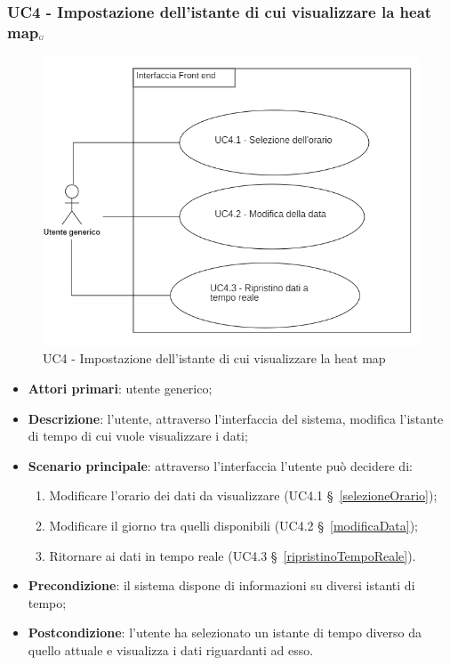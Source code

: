 \subsubsection{UC4 - Impostazione dell’istante di cui visualizzare la heat map$_{\scaleto{G}{3pt}}$
} \label{impostazioneIstanteTempo}%
\begin{center}
	\begin{figure}[H]
		\includegraphics{../immagini/attori_casi/uc4.png}
		\caption{UC4 - Impostazione dell’istante di cui visualizzare la heat map}
	\end{figure}
\end{center}
\begin{itemize}
	\item \textbf{Attori primari}: utente generico;
	\item \textbf{Descrizione}: l’utente, attraverso l’interfaccia del sistema, modifica l’istante di tempo di cui vuole visualizzare i dati;
	\item \textbf{Scenario principale}: attraverso l’interfaccia l’utente può decidere di:
		\begin{enumerate}
			\item Modificare l’orario dei dati da visualizzare (UC4.1 \S~\ref{selezioneOrario});
			\item Modificare il giorno tra quelli disponibili (UC4.2 \S~\ref{modificaData});
			\item Ritornare ai dati in tempo reale (UC4.3 \S~\ref{ripristinoTempoReale}).
		\end{enumerate}
	\item \textbf{Precondizione}: il sistema dispone di informazioni su diversi istanti di tempo;
	\item \textbf{Postcondizione}: l’utente ha selezionato un istante di tempo diverso da quello attuale e visualizza i dati riguardanti ad esso.%
\end{itemize}

